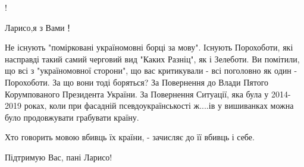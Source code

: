 \begin{itemize}
 
!

 
Ларисо,я з Вами！

 

Не існують "помірковані україномовні борці за мову". Існують Порохоботи, які
насправді такий самий черговий вид "Каких Разніц", як і Зелеботи. Ви помітили,
що всі з "україномовної сторони", що вас критикували - всі поголовно як один -
Порохоботи. За що вони тоді боряться? За Повернення до Влади Пятого
Корумпованого Президента України. За Повернення Ситуації, яка була у 2014-2019
роках, коли при фасадній псевдоукраїнськості ж....ів у вишиванках можна було
продовжувати грабувати країну.

 
Хто говорить мовою вбивць їх країни, - зачисляє до її вбивць і себе.

 
Підтримую Вас, пані Ларисо!

 

\end{itemize}
